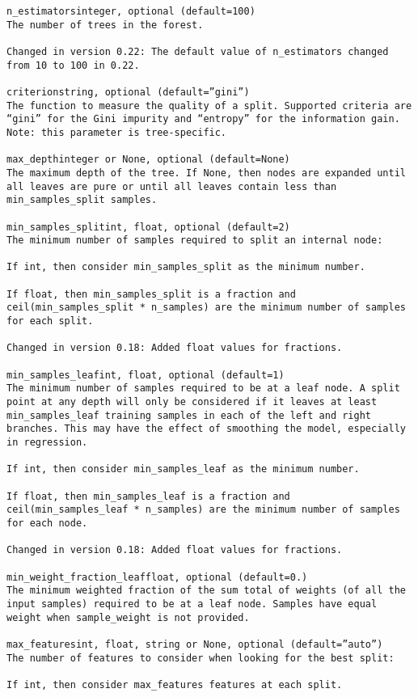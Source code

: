 \documentclass[12pt]{article}
\begin{document}
\begin{verbatim}
n_estimatorsinteger, optional (default=100)
The number of trees in the forest.

Changed in version 0.22: The default value of n_estimators changed from 10 to 100 in 0.22.

criterionstring, optional (default=”gini”)
The function to measure the quality of a split. Supported criteria are “gini” for the Gini impurity and “entropy” for the information gain. Note: this parameter is tree-specific.

max_depthinteger or None, optional (default=None)
The maximum depth of the tree. If None, then nodes are expanded until all leaves are pure or until all leaves contain less than min_samples_split samples.

min_samples_splitint, float, optional (default=2)
The minimum number of samples required to split an internal node:

If int, then consider min_samples_split as the minimum number.

If float, then min_samples_split is a fraction and ceil(min_samples_split * n_samples) are the minimum number of samples for each split.

Changed in version 0.18: Added float values for fractions.

min_samples_leafint, float, optional (default=1)
The minimum number of samples required to be at a leaf node. A split point at any depth will only be considered if it leaves at least min_samples_leaf training samples in each of the left and right branches. This may have the effect of smoothing the model, especially in regression.

If int, then consider min_samples_leaf as the minimum number.

If float, then min_samples_leaf is a fraction and ceil(min_samples_leaf * n_samples) are the minimum number of samples for each node.

Changed in version 0.18: Added float values for fractions.

min_weight_fraction_leaffloat, optional (default=0.)
The minimum weighted fraction of the sum total of weights (of all the input samples) required to be at a leaf node. Samples have equal weight when sample_weight is not provided.

max_featuresint, float, string or None, optional (default=”auto”)
The number of features to consider when looking for the best split:

If int, then consider max_features features at each split.


\end{verbatim}
\end{document}
